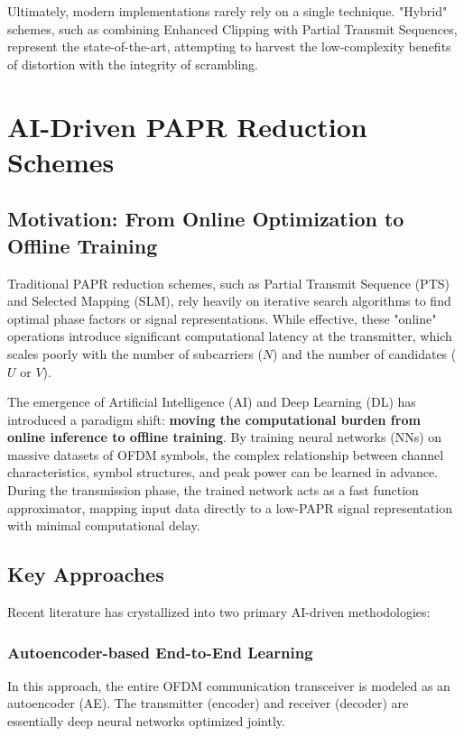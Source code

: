 \documentclass[journal]{IEEEtran}
\begin{document}
Ultimately, modern implementations rarely rely on a single technique. "Hybrid" schemes, such as combining Enhanced Clipping with Partial Transmit Sequences, represent the state-of-the-art, attempting to harvest the low-complexity benefits of distortion with the integrity of scrambling.

\section{AI-Driven PAPR Reduction Schemes}

\subsection{Motivation: From Online Optimization to Offline Training}
Traditional PAPR reduction schemes, such as Partial Transmit Sequence (PTS) and Selected Mapping (SLM), rely heavily on iterative search algorithms to find optimal phase factors or signal representations. While effective, these "online" operations introduce significant computational latency at the transmitter, which scales poorly with the number of subcarriers ($N$) and the number of candidates ($U$ or $V$).

The emergence of Artificial Intelligence (AI) and Deep Learning (DL) has introduced a paradigm shift: \textbf{moving the computational burden from online inference to offline training}. By training neural networks (NNs) on massive datasets of OFDM symbols, the complex relationship between channel characteristics, symbol structures, and peak power can be learned in advance. During the transmission phase, the trained network acts as a fast function approximator, mapping input data directly to a low-PAPR signal representation with minimal computational delay.

\subsection{Key Approaches}
Recent literature has crystallized into two primary AI-driven methodologies:

\subsubsection{Autoencoder-based End-to-End Learning}
In this approach, the entire OFDM communication transceiver is modeled as an autoencoder (AE). The transmitter (encoder) and receiver (decoder) are essentially deep neural networks optimized jointly.
\end{document}
